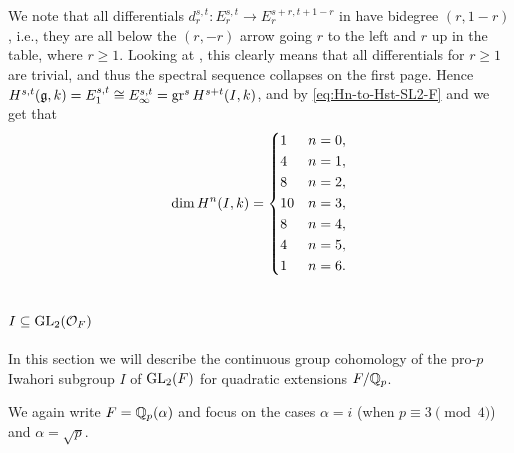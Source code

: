 We note that all differentials $d_{r}^{s,t} \colon E_{r}^{s,t} \to E_{r}^{s+r,t+1-r}$ in  have bidegree $(r,1-r)$, i.e., they are all below the $(r,-r)$ arrow going $r$ to the left and $r$ up in the table, where $r \geq 1$. Looking at , this clearly means that all differentials for $r \geq 1$ are trivial, and thus the spectral sequence collapses on the first page. Hence $H^{s,t}(\mathfrak{g},k) = E_{1}^{s,t} \cong E_{\infty}^{s,t} = \operatorname{gr}^{s} H^{s+t}(I,k)$, and by \eqref{eq:Hn-to-Hst-SL2-F} and  we get that
\begin{equation}
  \label{eq:dim-HnI-SL2-F}
  \dim H^{n}(I,k) =
  \begin{dcases}
    1 & n=0, \\
    4 & n=1, \\
    8 & n=2, \\
    10 & n=3, \\
    8 & n=4, \\
    4 & n=5, \\
    1 & n=6.
  \end{dcases}
\end{equation}


\section[\texorpdfstring{$I \subseteq \GL_{2}(\sO_{F})$}{I in GL2(OF)}, quadratic]{\texorpdfstring{$I \subseteq \GL_{2}(\sO_{F})$}{I in GL2(OF)}}%
\label{sec:Iwa-GL2-F}

In this section we will describe the continuous group cohomology of the pro-$p$ Iwahori subgroup $I$ of $\operatorname{GL}_{2}(F)$ for quadratic extensions $F/\mathbb{Q}_{p}$.

We again write $F = \mathbb{Q}_{p}(\alpha)$ and focus on the cases $\alpha = i$ (when $p \equiv 3 \pmod{4}$) and $\alpha = \sqrt{p}$.

